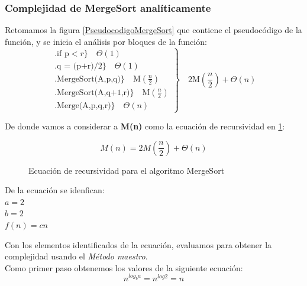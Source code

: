     \newpage
    
    \subsubsection*{Complejidad de \textbf{MergeSort} analíticamente}
        Retomamos la figura \ref{PseudocodigoMergeSort} que contiene el pseudocódigo de la función, y se inicia el análisis por bloques de la función:
    \begin{equation*}
        \left.
            \begin{aligned}
                \bigl.
                    \text{if p}<r
                \bigr\}
                \quad\Theta(1)
                \\
                \bigl.
                    \text{q = (p+r)/2}
                \bigr\}
                \quad\Theta(1)
                \\
                \bigl.
                    \text{MergeSort(A,p,q)}
                \bigr\}
                \quad\text{M}\left(\frac{n}{2}\right)
                \\
                \bigl.
                    \text{MergeSort(A,q+1,r)}
                \bigr\}
                \quad\text{M}\left(\frac{n}{2}\right)
                \\
                \bigl.
                    \text{Merge(A,p,q,r)}
                \bigr\}
                \quad\Theta(n)
            \end{aligned}
        \right\}
        \quad2\text{M}\left(\frac{n}{2}\right)+\Theta(n)
    \end{equation*}
    
    De donde vamos a considerar a \textbf{M(n)} como la ecuación de recursividad en \ref{EcuacionRecursivaMergeSort}:
    \begin{figure}[h!]
        \centering
        \begin{equation*}
            M(n)=2M \left( \frac{n}{2} \right) +\Theta(n)
        \end{equation*}
        \caption{Ecuación de recursividad para el algoritmo MergeSort}
        \label{EcuacionRecursivaMergeSort}
    \end{figure}
    
    De la ecuación se idenfican:\\
    $a = 2$\\
    $b = 2$\\
    $f(n) = cn$
    
    Con los elementos identificados de la ecuación, evaluamos para obtener la complejidad usando el \textit{Método maestro}.\\
    Como primer paso obtenemos los valores de la siguiente ecuación:
    \begin{equation*}
        n^{log_ba} = n^{log2} = n
    \end{equation*}
    

